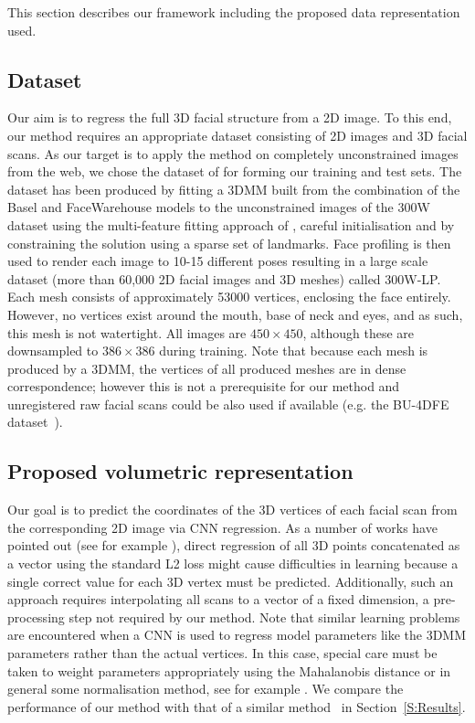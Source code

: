 This section describes our framework including the proposed data representation used.


\subsection{Dataset}

Our aim is to regress the full 3D facial structure from a 2D image. To
this end, our method requires an appropriate dataset consisting of 2D
images and 3D facial scans. As our target is to apply the method on
completely unconstrained images from the web, we chose the dataset of
\cite{zhu2016face} for forming our training and test sets. The dataset
has been produced by fitting a 3DMM built from the combination of the
Basel \cite{paysan20093d} and FaceWarehouse
\cite{cao2014facewarehouse} models to the unconstrained images of the
300W dataset \cite{sagonas2013semi} using the multi-feature fitting
approach of \cite{romdhani2005estimating}, careful initialisation and
by constraining the solution using a sparse set of landmarks. Face
profiling is then used to render each image to 10-15 different poses
resulting in a large scale dataset (more than 60,000 2D facial images
and 3D meshes) called 300W-LP. Each mesh consists of approximately
53000 vertices, enclosing the face entirely. However, no vertices
exist around the mouth, base of neck and eyes, and as such, this mesh
is not watertight. All images are $450 \times 450$, although these are
downsampled to $386 \times 386$ during training. Note that because
each mesh is produced by a 3DMM, the vertices of all produced meshes
are in dense correspondence; however this is not a prerequisite for
our method and unregistered raw facial scans could be also used if
available (e.g. the BU-4DFE dataset~\cite{yin2008high}).

\subsection{Proposed volumetric representation}

Our goal is to predict the coordinates of the 3D vertices of each
facial scan from the corresponding 2D image via CNN regression. As a
number of works have pointed out (see for example
\cite{tompson2015efficient, pfister2015flowing}), direct regression of
all 3D points concatenated as a vector using the standard L2 loss
might cause difficulties in learning because a single correct value
for each 3D vertex must be predicted. Additionally, such an approach
requires interpolating all scans to a vector of a fixed dimension, a
pre-processing step not required by our method. Note that similar
learning problems are encountered when a CNN is used to regress model
parameters like the 3DMM parameters rather than the actual
vertices. In this case, special care must be taken to weight
parameters appropriately using the Mahalanobis distance or in general
some normalisation method, see for example \cite{zhu2016face}. We
compare the performance of our method with that of a similar
method~\cite{zhu2016face} in Section~\ref{S:Results}.

